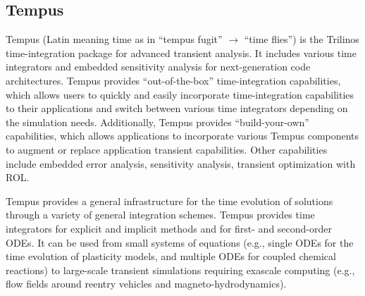 \subsection{Tempus}
Tempus (Latin meaning time as in “tempus fugit” $\rightarrow$ “time flies”)
is the Trilinos time-integration package for advanced transient
analysis.  It includes various time integrators and embedded
sensitivity analysis for next-generation code architectures.  Tempus
provides “out-of-the-box” time-integration capabilities, which
allows users to quickly and easily incorporate time-integration
capabilities to their applications and switch between various time
integrators depending on the simulation needs.  Additionally, Tempus
provides “build-your-own” capabilities, which allows applications
to incorporate various Tempus components to augment or replace
application transient capabilities. Other capabilities include
embedded error analysis, sensitivity analysis, transient optimization
with ROL.

Tempus provides a general infrastructure for the time evolution of
solutions through a variety of general integration schemes.  Tempus
provides time integrators for explicit and implicit methods and for
first- and second-order ODEs.  It can be used from small systems of
equations (e.g., single ODEs for the time evolution of plasticity
models, and multiple ODEs for coupled chemical reactions) to
large-scale transient simulations requiring exascale computing
(e.g., flow fields around reentry vehicles and magneto-hydrodynamics).


